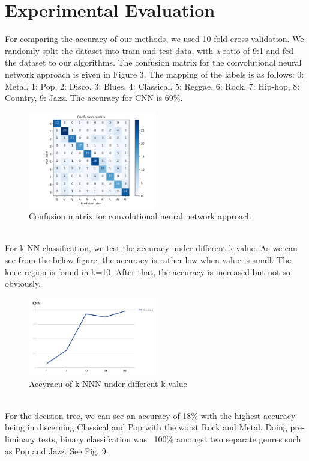 \documentclass[acmtog, authorversion]{acmart}
\begin{document}
\section{Experimental Evaluation}
For comparing the accuracy of our methods, we used 10-fold cross validation. We randomly split the dataset into train and test data, with a ratio of 9:1
and fed the dataset to our algorithms. The confusion matrix for the convolutional neural network approach is given in Figure 3. The mapping of the labels is as follows:
 0: Metal, 1: Pop, 2: Disco, 3: Blues, 4: Classical, 5: Reggae, 6: Rock, 7: Hip-hop, 8: Country, 9: Jazz. The accuracy for CNN is 69\%. \\
\begin{figure}[h!]
  \centering
  \includegraphics[width=0.5\textwidth]{conf_matrix}
  \caption{Confusion matrix for convolutional neural network approach}
  \end{figure}
\\
For k-NN classification, we test the accuracy under different k-value. As we can see from the below figure, the accuracy is rather low when value is small. The knee region is found in k=10, After that, the accuracy is increased but not so obviously.

\begin{figure}[h!]
  \centering
  \includegraphics[width=0.5\textwidth]{knnAccuracy.png}
  \caption{Accyracu of k-NNN under different k-value}
  \end{figure}
\\  
For the decision tree, we can see an accuracy of 18\% with the highest accuracy being in discerning Classical and Pop with the worst Rock and Metal. Doing pre-liminary tests, binary classifcation was ~100\% amongst two separate genres such as Pop and Jazz. See Fig. 9.
\end{document}
